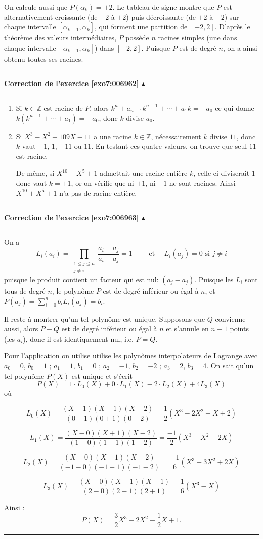 \documentclass[11pt,a4paper]{article}
\newcommand{\Zz}{\mathbb{Z}} \newcommand{\Z}{\mathbb{Z}}
\renewcommand{\le}{\leqslant} \renewcommand{\leq}{\leqslant}
\newcounter{exo}
\newcommand{\correction}[1]{\hypertarget{cor7:#1}{}\label{cor7:#1}{\bf Correction de \hyperlink{exo7:#1}{l'exercice \ref{exo7:#1} $\blacktriangle$}}\vspace{1mm}\hrule\vspace{1mm}}
\newcommand{\fincorrection}{\vspace{1mm}\hrule\vspace*{7mm}}
\begin{document}
\begin{enumerate}
On calcule aussi que $P(\alpha_k) = \pm 2$.
Le tableau de signe montre que $P$ est alternativement croissante 
(de $-2$ à $+2$) puis décroissante (de $+2$ à $-2$) 
sur chaque intervalle
$[\alpha_{k+1}, \alpha_k]$, qui forment une partition de $[-2,2]$.
D'après le théorème des valeurs intermédiaires, $P$ possède $n$ racines simples 
(une dans chaque intervalle $[\alpha_{k+1}, \alpha_k]$) dans $[-2,2]$. 
Puisque $P$ est de degré $n$, on a ainsi obtenu toutes ses racines.

\end{enumerate}
\fincorrection
\correction{006962}
\begin{enumerate}
\item Si $k\in\Zz$ est racine de $P$, alors $k^n+a_{n-1}k^{n-1}+\cdots+a_1k=-a_0$ 
ce qui donne $k(k^{n-1}+\cdots+a_1)=-a_0$, donc $k$ divise $a_0$.

\item Si $X^3-X^2-109X-11$ a une racine $k\in\Zz$, nécessairement $k$ divise $11$, 
donc $k$ vaut $-1$, $1$, $-11$ ou $11$. En testant ces quatre valeurs, on trouve 
que seul $11$ est racine. 

De même, si $X^{10}+X^5+1$ admettait une racine entière $k$, celle-ci diviserait $1$ donc vaut 
$k = \pm 1$, or on vérifie que ni $+1$, ni $-1$ ne sont racines.
Ainsi $X^{10}+X^5+1$ n'a pas de racine entière.
\end{enumerate}
\fincorrection
\correction{006963}
On a 
$$L_i(a_i)=\prod_{\substack{1\le j\le n \\ j\not= i}}\frac{a_i-a_j}{a_i-a_j}=1
\qquad \text{ et } \quad L_i(a_j)=0  \text{ si } j\not=i$$
puisque le produit contient un facteur qui est nul: $(a_j-a_j)$. 
Puisque les $L_i$ sont tous de degré $n$, le polynôme $P$ est de degré inférieur ou égal à $n$, et 
$P(a_j)=\sum_{i=0}^nb_iL_i(a_j)=b_i$. 

Il reste à montrer qu'un tel polynôme est unique. Supposons que $Q$ convienne aussi, 
alors $P-Q$ est de degré inférieur ou égal à 
$n$ et s'annule en $n+1$ points (les $a_i$), donc il est identiquement nul, i.e. $P=Q$.

\bigskip

Pour l'application on utilise utilise les polynômes interpolateurs de Lagrange avec
$a_0=0$, $b_0=1$ ; $a_1=1$, $b_1=0$ ; $a_2=-1$, $b_2=-2$ ; $a_3=2$, $b_3=4$. 
On sait qu'un tel polynôme $P(X)$ est unique et s'écrit 
$$P(X)=1\cdot L_0(X)+0\cdot L_1(X)-2\cdot L_2(X)+4L_3(X)$$
où

$$L_0(X)=\frac{(X-1)(X+1)(X-2)}{(0-1)(0+1)(0-2)}=\frac{1}{2}(X^3-2X^2-X+2)$$

$$L_1(X)=\frac{(X-0)(X+1)(X-2)}{(1-0)(1+1)(1-2)}=\frac{-1}{2}(X^3-X^2-2X)$$

$$L_2(X)=\frac{(X-0)(X-1)(X-2)}{(-1-0)(-1-1)(-1-2)}=\frac{-1}{6}(X^3-3X^2+2X)$$

$$L_3(X)=\frac{(X-0)(X-1)(X+1)}{(2-0)(2-1)(2+1)}=\frac{1}{6}(X^3-X)$$

Ainsi :
$$P(X)=\frac{3}{2}X^3-2X^2-\frac{1}{2}X+1.$$

\fincorrection
\end{document}
